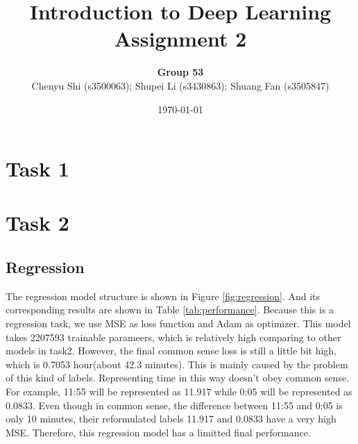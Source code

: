 \documentclass{article}
\title{Introduction to Deep Learning\\Assignment 2} %
\author{\textbf{Group 53}\\Chenyu Shi (s3500063); Shupei Li (s3430863); Shuang Fan (s3505847)} %
\date{\today} %
\begin{document}

\maketitle %

\section*{Task 1}

\section*{Task 2}
\setcounter{section}{2}
\subsection{Regression}
The regression model structure is shown in Figure \ref{fig:regression}. And its corresponding results are shown in Table \ref{tab:performance}. Because this is a regression task, we use MSE as loss function and Adam as optimizer. This model takes 2207593 trainable parameers, which is relatively high comparing to other models in task2. However, the final common sense loss is still a little bit high, which is 0.7053 hour(about 42.3 minutes). This is mainly caused by the problem of this kind of labels. Representing time in this way doesn't obey common sense. For example, 11:55 will be represented as 11.917 while 0:05 will be represented as 0.0833. Even though in common sense, the difference between 11:55 and 0:05 is only 10 minutes, their reformulated labels 11.917 and 0.0833 have a very high MSE. Therefore, this regression model has a limitted final performance.
\end{document}
